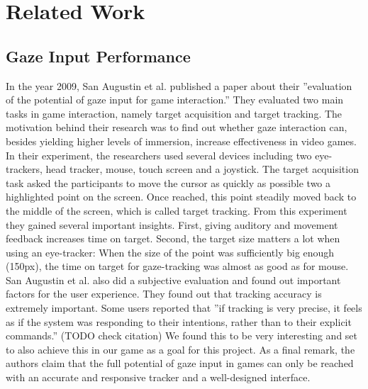 \documentclass{sigchi}
\begin{document}
\section{Related Work}
\subsection{Gaze Input Performance}
In the year 2009, San Augustin et al. published a paper about their ''evaluation of the potential of gaze input for game interaction.'' \cite{san2009evaluation} They evaluated two main tasks in game interaction, namely target acquisition and target tracking. The motivation behind their research was to find out whether gaze interaction can, besides yielding higher levels of immersion, increase effectiveness in video games. In their experiment, the researchers used several devices including two eye-trackers, head tracker, mouse, touch screen and a joystick. The target acquisition task asked the participants to move the cursor as quickly as possible two a highlighted point on the screen. Once reached, this point steadily moved back to the middle of the screen, which is called target tracking. From this experiment they gained several important insights. First, giving auditory and movement feedback increases time on target. Second, the target size matters a lot when using an eye-tracker: When the size of the point was sufficiently big enough (150px), the time on target for gaze-tracking was almost as good as for mouse.\\
San Augustin et al. also did a subjective evaluation and found out important factors for the user experience. They found out that tracking accuracy is extremely important. Some users reported that ''if tracking is very precise, it feels as if the system was responding to their intentions, rather than to their explicit commands.''\cite{san2009evaluation} (TODO check citation) We found this to be very interesting and set to also achieve this in our game as a goal for this project. As a final remark, the authors claim that the full potential of gaze input in games can only be reached with an accurate and responsive tracker and a well-designed interface.
\end{document}
